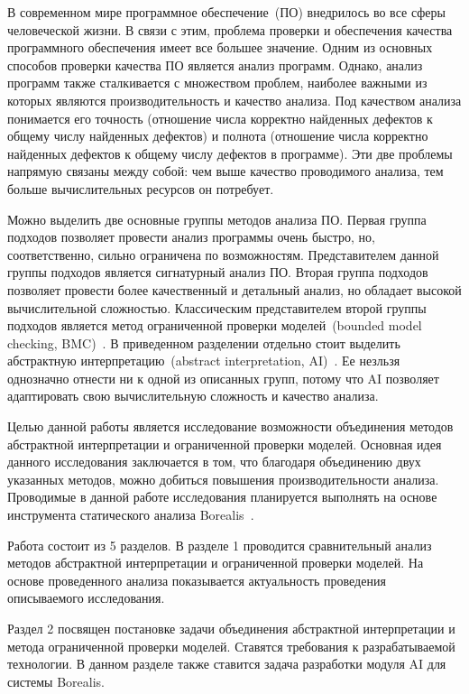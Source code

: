 \intro
В современном мире программное обеспечение~(ПО) внедрилось во все сферы 
человеческой жизни. В связи с этим, проблема проверки и обеспечения качества 
программного обеспечения имеет все большее значение. Одним из основных способов 
проверки качества ПО является анализ программ. Однако, анализ программ также 
сталкивается с множеством проблем, наиболее важными из которых являются 
производительность и качество анализа. Под качеством анализа понимается его 
точность (отношение числа корректно найденных дефектов к общему числу найденных 
дефектов) и полнота (отношение числа корректно найденных дефектов к общему 
числу дефектов в программе). Эти две проблемы напрямую связаны между собой:
чем выше качество проводимого анализа, тем больше вычислительных ресурсов он 
потребует.

Можно выделить две основные группы методов анализа ПО. Первая группа подходов 
позволяет провести анализ программы очень быстро, но, соответственно, сильно
ограничена по возможностям. Представителем данной группы подходов является 
сигнатурный анализ ПО. Вторая группа подходов позволяет провести более 
качественный и детальный анализ, но обладает высокой вычислительной сложностью.
Классическим представителем второй группы подходов является метод ограниченной 
проверки моделей~(bounded model checking, BMC)~\cite{bmc}. В приведенном 
разделении отдельно стоит выделить абстрактную интерпретацию~(abstract 
interpretation, AI)~\cite{ai}. Ее незльзя однозначно отнести ни к одной 
из описанных групп, потому что AI позволяет адаптировать свою вычислительную 
сложность и качество анализа.

Целью данной работы является исследование возможности объединения методов 
абстрактной интерпретации и ограниченной проверки моделей. Основная идея 
данного исследования заключается в том, что благодаря объединению двух 
указанных методов, можно добиться повышения производительности анализа. 
Проводимые в данной работе исследования планируется выполнять на основе 
инструмента статического анализа Borealis~\cite{borealis}.

Работа состоит из 5 разделов. В разделе 1 проводится сравнительный анализ 
методов абстрактной интерпретации и ограниченной проверки моделей. На основе 
проведенного анализа показывается актуальность проведения описываемого 
исследования.

Раздел 2 посвящен постановке задачи объединения абстрактной интерпретации и
метода ограниченной проверки моделей. Ставятся требования к разрабатываемой 
технологии. В данном разделе также ставится задача разработки модуля AI для
системы Borealis.

